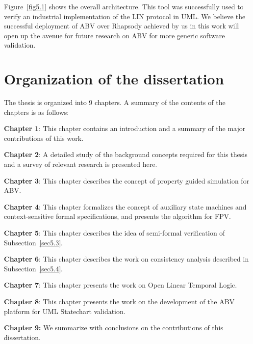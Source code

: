 \documentclass[a4paper, 11pt]{article}
\begin{document}
Figure~\ref{fig5.1} shows the overall architecture. This tool was successfully 
used to verify an industrial implementation of the LIN protocol in UML.
We believe the successful deployment of ABV over Rhapsody achieved by us 
in this work will open up the avenue for future research on ABV for 
more generic software validation.

\section{Organization of the dissertation} \label{sec8}
The thesis is organized into 9 chapters. A summary of the contents of the
chapters is as follows:

\begin{description}
\item {\bf Chapter 1}: This chapter contains an introduction and a summary
of the major contributions of this work.

\item {\bf Chapter 2}: A detailed study of the background concepts required 
for this thesis and a survey of relevant research is presented
here.

\item {\bf Chapter 3}: This chapter describes the concept of 
property guided simulation for ABV.

\item {\bf Chapter 4}: This chapter formalizes the concept of auxiliary 
state machines and context-sensitive formal specifications, and 
presents the algorithm for FPV.

\item {\bf Chapter 5}: This chapter describes the idea of semi-formal 
verification of Subsection~\ref{sec5.3}. 

\item {\bf Chapter 6}: This chapter describes the work on consistency 
analysis described in Subsection~\ref{sec5.4}.

\item {\bf Chapter 7}: This chapter presents the work on Open Linear Temporal 
Logic.

\item {\bf Chapter 8}: This chapter presents the work on the development 
of the ABV platform for UML Statechart validation.

\item {\bf Chapter 9:} We summarize with conclusions on the contributions of 
this dissertation.

\end{description} 
\end{document}
